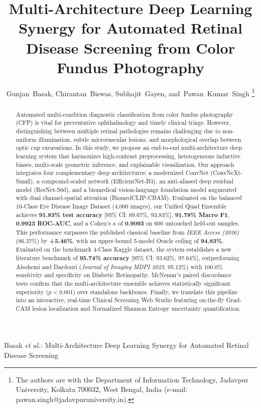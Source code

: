 \documentclass[journal]{IEEEtran}
\begin{document}
\title{Multi-Architecture Deep Learning Synergy for Automated Retinal Disease Screening from Color Fundus Photography}

\author{Gunjan~Basak,
        Chirantan~Biswas,
        Subhajit~Gayen,
        and~Pawan~Kumar~Singh%
\thanks{The authors are with the Department of Information Technology, Jadavpur University, Kolkata 700032, West Bengal, India (e-mail: pawan.singh@jadavpuruniversity.in).}}

%
{Basak \MakeLowercase{\textit{et al.}}: Multi-Architecture Deep Learning Synergy for Automated Retinal Disease Screening}

\maketitle

\begin{abstract}
Automated multi-condition diagnostic classification from color fundus photography (CFP) is vital for preventative ophthalmology and timely clinical triage. However, distinguishing between multiple retinal pathologies remains challenging due to non-uniform illumination, subtle microvascular lesions, and morphological overlap between optic cup excavations. In this study, we propose an end-to-end multi-architecture deep learning system that harmonizes high-contrast preprocessing, heterogeneous inductive biases, multi-scale geometric inference, and explainable visualization. Our approach integrates four complementary deep architectures: a modernized ConvNet (ConvNeXt-Small), a compound-scaled network (EfficientNet-B3), an anti-aliased deep residual model (ResNet-50d), and a biomedical vision-language foundation model augmented with dual channel-spatial attention (BiomedCLIP-CBAM). Evaluated on the balanced 10-Class Eye Disease Image Dataset (4,000 images), our Unified Quad Ensemble achieves \textbf{91.83\% test accuracy} [95\% CI: 89.67\%, 93.83\%], \textbf{91.78\% Macro F1}, \textbf{0.9923 ROC-AUC}, and a Cohen's $\kappa$ of \textbf{0.9093} on 600 untouched held-out samples. This performance surpasses the published classical baseline from \textit{IEEE Access (2026)} (86.37\%) by \textbf{+5.46\%}, with an upper-bound 5-model Oracle ceiling of \textbf{94.83\%}. Evaluated on the benchmark 4-Class Kaggle dataset, the system establishes a new literature benchmark of \textbf{95.74\% accuracy} [95\% CI: 93.62\%, 97.64\%], outperforming Alsohemi and Dardouri (\textit{Journal of Imaging MDPI 2025}, 95.12\%) with 100.0\% sensitivity and specificity on Diabetic Retinopathy. McNemar's paired discordance tests confirm that the multi-architecture ensemble achieves statistically significant superiority ($p < 0.001$) over standalone backbones. Finally, we translate this pipeline into an interactive, real-time Clinical Screening Web Studio featuring on-the-fly Grad-CAM lesion localization and Normalized Shannon Entropy uncertainty quantification.
\end{abstract}
\end{document}
